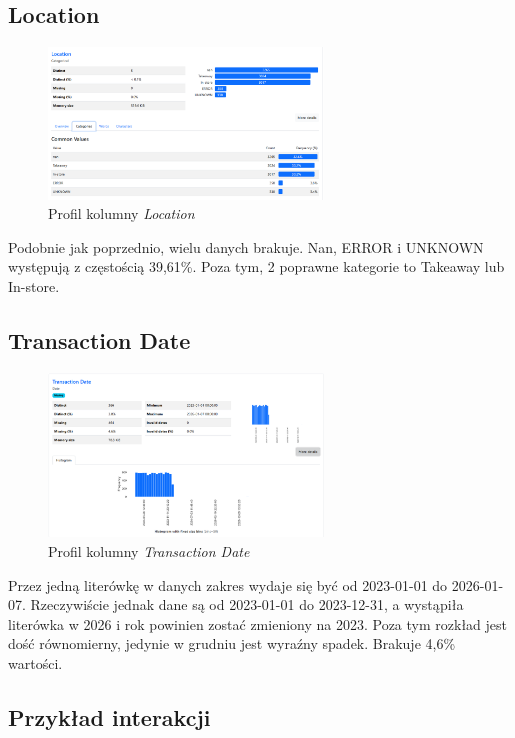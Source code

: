 \documentclass[a4paper,12pt]{article}
\begin{document}
\subsection{Location}

\begin{figure}[H]
  \centering
  \includegraphics[width=0.65\textwidth]{images/py_7.png}
  \caption{Profil kolumny \textit{Location}}
\end{figure}

Podobnie jak poprzednio, wielu danych brakuje. Nan, ERROR i UNKNOWN występują z częstością 39,61\%. Poza tym, 2 poprawne kategorie to Takeaway lub In-store.

\subsection{Transaction Date}

\begin{figure}[H]
  \centering
  \includegraphics[width=0.65\textwidth]{images/py_8.png}
  \caption{Profil kolumny \textit{Transaction Date}}
\end{figure}

Przez jedną literówkę w danych zakres wydaje się być od 2023-01-01 do 2026-01-07. Rzeczywiście jednak dane są od 2023-01-01 do 2023-12-31, a wystąpiła literówka w 2026 i rok powinien zostać zmieniony na 2023. Poza tym rozkład jest dość równomierny, jedynie w grudniu jest wyraźny spadek. Brakuje 4,6\% wartości.

\subsection{Przykład interakcji}
\end{document}
